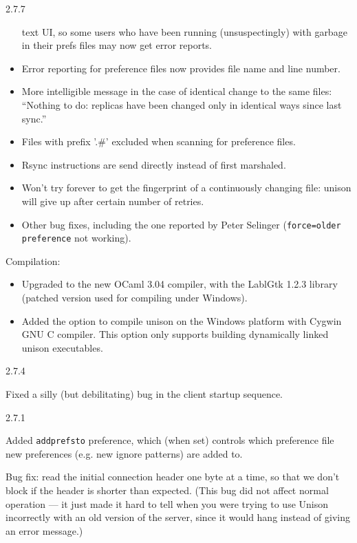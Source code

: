 \begin{changesfromversion}{2.7.7}
\begin{itemize}
    text UI, so some users who have been running (unsuspectingly) with 
    garbage in their prefs files may now get error reports.
  \item Error reporting for preference files now provides file name and
    line number.
  \item More intelligible message in the case of identical change to the same 
    files: ``Nothing to do: replicas have been changed only in identical 
    ways since last sync.''
  \item Files with prefix '.\#' excluded when scanning for preference
    files.
  \item Rsync instructions are send directly instead of first
    marshaled.
  \item Won't try forever to get the fingerprint of a continuously changing file:
    unison will give up after certain number of retries.
  \item Other bug fixes, including the one reported by Peter Selinger
    (\verb|force=older preference| not working).
  \end{itemize}
\item Compilation:
  \begin{itemize}
  \item Upgraded to the new OCaml 3.04 compiler, with the LablGtk
    1.2.3 library (patched version used for compiling under Windows).
  \item Added the option to compile unison on the Windows platform with
    Cygwin GNU C compiler.  This option only supports building
    dynamically linked unison executables.
  \end{itemize}
\end{changesfromversion}

\begin{changesfromversion}{2.7.4}
\item Fixed a silly (but debilitating) bug in the client startup sequence.
\end{changesfromversion}

\begin{changesfromversion}{2.7.1}
\item Added \verb|addprefsto| preference, which (when set) controls which
preference file new preferences (e.g. new ignore patterns) are added to.
\item Bug fix: read the initial connection header one byte at a time, so
that we don't block if the header is shorter than expected.  (This bug
did not affect normal operation --- it just made it hard to tell when you
were trying to use Unison incorrectly with an old version of the server,
since it would hang instead of giving an error message.)
\end{changesfromversion}

